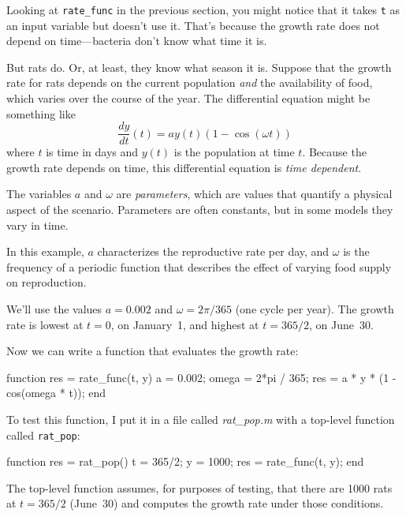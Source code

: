 Looking at \lstinline{rate_func} in the previous section, you might notice that it takes \lstinline{t} as an input variable but doesn't use it.  That's because the growth rate does not depend on time---bacteria don't know what time it is.


But rats do.  Or, at least, they know what season it is.
Suppose that the growth rate for rats depends on the current population \emph{and} the availability of food, which varies over the course of the year.
The differential equation might be something like
%
\begin{equation*}
\frac{dy}{dt}(t) = a y(t) \left(1 - \cos (\omega t) \right)
\end{equation*}
%
where $t$ is time in days and $y(t)$ is the population at time $t$.
Because the growth rate depends on time, this differential equation is \emph{time dependent}.

The variables $a$ and $\omega$ are \emph{parameters}, which are values that
quantify a physical aspect of the scenario.  Parameters are often constants, but in some models they vary in time.


In this example, $a$ characterizes the reproductive rate per day, and
$\omega$ is the frequency of a periodic function that describes
the effect of varying food supply on reproduction.

We'll use the values $a = 0.002$
and $\omega = 2 \pi/365$ (one cycle per year).
The growth rate is lowest at $t=0$, on January~1, and highest at $t=365/2$, on June~30.

Now we can write a function that evaluates the growth rate:

\begin{code}
function res = rate_func(t, y)
    a = 0.002;
    omega = 2*pi / 365;
    res = a * y * (1 - cos(omega * t));
end
\end{code}

To test this function, I put it in a file called \emph{rat\_pop.m} with a top-level function called
\lstinline{rat_pop}:

\begin{code}
function res = rat_pop()
    t = 365/2;
    y = 1000;
    res = rate_func(t, y);
end
\end{code}

The top-level function assumes, for purposes of testing, that
there are 1000 rats at $t=365/2$ (June~30) and computes the growth rate under those conditions.

